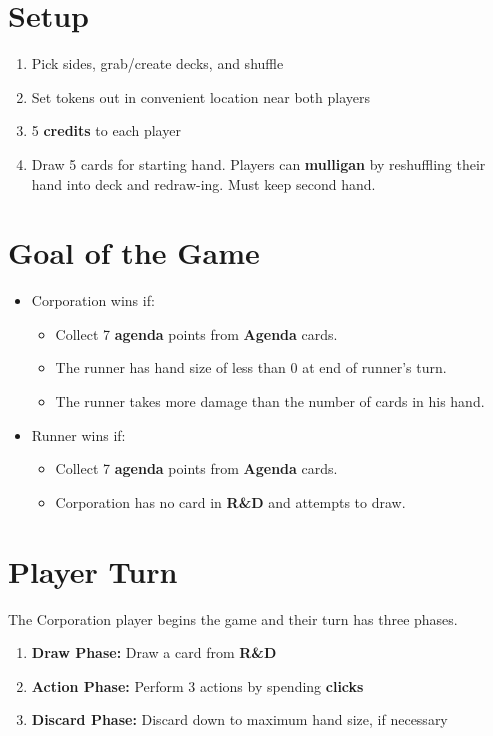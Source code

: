 \documentclass[12pt]{article}
\newenvironment{enumerateCustom}
{\begin{enumerate}
  \setlength{\itemsep}{1pt}
  \setlength{\parskip}{0pt}
  \setlength{\parsep}{0pt}}
{\end{enumerate}}
\newenvironment{itemizeCustom}
{\begin{itemize}
  \setlength{\itemsep}{1pt}
  \setlength{\parskip}{0pt}
  \setlength{\parsep}{0pt}}
{\end{itemize}}
\begin{document}
\begin{multicols*}{2}

\section*{Setup}
\begin{enumerateCustom}
	\item Pick sides, grab/create decks, and shuffle
	\item Set tokens out in convenient location near both players
	\item 5 \textbf{credits} to each player
	\item Draw 5 cards for starting hand. Players can \textbf{mulligan} by reshuffling their hand into deck and redraw-ing. Must keep second hand.
\end{enumerateCustom}

\section*{Goal of the Game}
\begin{itemizeCustom}
	\item Corporation wins if:
		\begin{itemizeCustom}
			\item Collect 7 \textbf{agenda} points from \textbf{Agenda} cards.
			\item The runner has hand size of less than 0 at end of runner's turn.
			\item The runner takes more damage than the number of cards in his hand.
		\end{itemizeCustom}
	\item Runner wins if:
		\begin{itemizeCustom}
			\item Collect 7 \textbf{agenda} points from \textbf{Agenda} cards.
			\item Corporation has no card in \textbf{R\&D} and attempts to draw.
		\end{itemizeCustom}
\end{itemizeCustom}

\section*{Player Turn}
The Corporation player begins the game and their turn has three phases.
\begin{enumerateCustom}
	\item \textbf{Draw Phase:} Draw a card from \textbf{R\&D}
	\item \textbf{Action Phase:} Perform 3 actions by spending \textbf{clicks}
	\item \textbf{Discard Phase:} Discard down to maximum hand size, if necessary
\end{enumerateCustom}


\end{multicols*}
\end{document}
